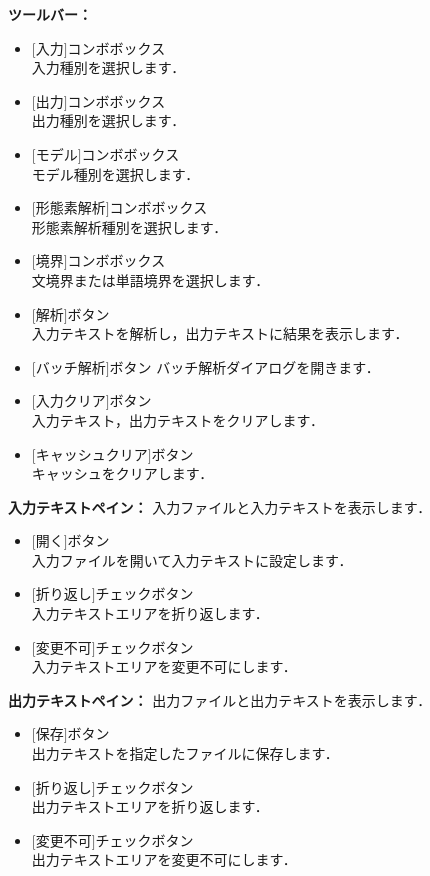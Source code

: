 \documentclass[titlepage]{jarticle}
\begin{document}
\textbf{ツールバー：}
\begin{itemize}
\item  $[$入力$]$コンボボックス \\
入力種別を選択します．
\item $[$出力$]$コンボボックス \\
出力種別を選択します．
\item $[$モデル$]$コンボボックス \\
モデル種別を選択します．
\item $[$形態素解析$]$コンボボックス \\
形態素解析種別を選択します．
\item $[$境界$]$コンボボックス \\
文境界または単語境界を選択します．
\item $[$解析$]$ボタン \\
入力テキストを解析し，出力テキストに結果を表示します．
\item $[$バッチ解析$]$ボタン
バッチ解析ダイアログを開きます．
\item $[$入力クリア$]$ボタン \\
入力テキスト，出力テキストをクリアします．
\item $[$キャッシュクリア$]$ボタン \\
キャッシュをクリアします．
\end{itemize}

\textbf{入力テキストペイン：}
入力ファイルと入力テキストを表示します．
\begin{itemize}
\item $[$開く$]$ボタン \\
入力ファイルを開いて入力テキストに設定します．
\item $[$折り返し$]$チェックボタン \\
入力テキストエリアを折り返します．
\item $[$変更不可$]$チェックボタン \\
入力テキストエリアを変更不可にします．
\end{itemize}

\textbf{出力テキストペイン：}
出力ファイルと出力テキストを表示します．
\begin{itemize}
\item $[$保存$]$ボタン \\
出力テキストを指定したファイルに保存します．
\item $[$折り返し$]$チェックボタン \\
出力テキストエリアを折り返します．
\item $[$変更不可$]$チェックボタン \\
出力テキストエリアを変更不可にします．
\end{itemize}
\end{document}
